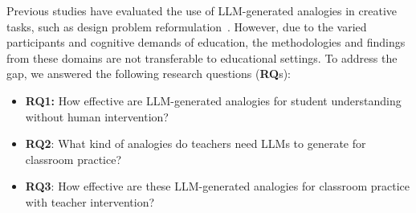 Previous studies have evaluated the use of LLM-generated analogies in creative tasks, such as design problem reformulation~\cite{ding_fluid_2023}. 
However, due to the varied participants and cognitive demands of education, the methodologies and findings from these domains are not transferable to educational settings.
To address the gap, we answered the following research questions (\textbf{RQ}s): 
\begin{itemize}
    \item \textbf{RQ1:} How effective are LLM-generated analogies for student understanding without human intervention? 
    \item \textbf{RQ2}: What kind of analogies do teachers need LLMs to generate for classroom practice?
    \item \textbf{RQ3}: How effective are these LLM-generated analogies for classroom practice with teacher intervention?
\end{itemize}

